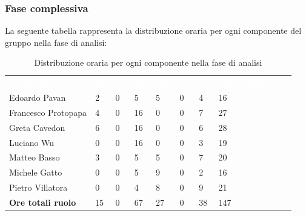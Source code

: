 \subsubsection{Fase complessiva}
La seguente tabella rappresenta la distribuzione oraria per ogni componente del gruppo nella fase di analisi:
\begin{table}[!htbp]
\begin{center}
\renewcommand{\arraystretch}{1.25}
\begin{tabular}{ m{}<{\centering}  m{}<{\centering} m{}<{\centering} m{}<{\centering}  m{}<{\centering}  m{}<{\centering}  m{}<{\centering}  m{}<{\centering}   }
	\rowcolor{darkblue}
	\textcolor{white}{\textbf{Componente}} &\textcolor{white}{\textbf{Re}}&\textcolor{white}{\textbf{Pt}}&\textcolor{white}{\textbf{An}}&\textcolor{white}{\textbf{Am}}&\textcolor{white}{\textbf{Pr}}&\textcolor{white}{\textbf{Ve}}&\textcolor{white}{\textbf{Ore complessive}}\\ 
	Edoardo Pavan & 2 & 0 & 5 & 5 & 0 & 4 & 16 \\	
	
	Francesco Protopapa & 4 & 0 & 16 & 0 & 0 & 7 & 27 \\

	Greta Cavedon & 6 & 0 & 16 & 0 & 0 & 6 & 28 \\
	
	Luciano Wu & 0 & 0 & 16 & 0 & 0 & 3 & 19 \\
	
	Matteo Basso & 3 & 0 & 5 & 5 & 0 & 7 & 20 \\
	
	Michele Gatto &  0 & 0 & 5 & 9 & 0 & 2 & 16 \\
	
	Pietro Villatora & 0 & 0 & 4 & 8 & 0 & 9 & 21 \\
	
	\textbf{Ore totali ruolo} & 15 & 0 & 67 & 27 & 0 & 38 & 147\\

\end{tabular}
\caption{Distribuzione oraria per ogni componente nella fase di analisi}
\end{center}
\end{table}

